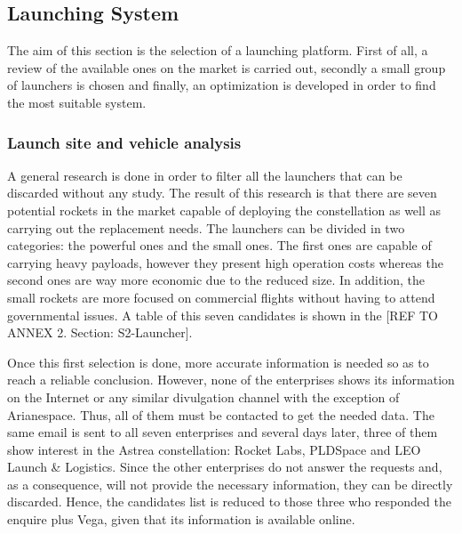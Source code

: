 \subsection{Launching System}
The aim of this section is the selection of a launching platform. First of all, a review of the available ones on the market is carried out, secondly a small group of launchers is chosen and finally, an optimization is developed in order to find the most suitable system. 

\subsubsection{Launch site and vehicle analysis}
A general research is done in order to filter all the launchers that can be discarded without any study. The result of this research is that there are seven potential rockets in the market capable of deploying the constellation as well as carrying out the replacement needs. The launchers can be divided in two categories: the powerful ones and the small ones. The first ones are capable of carrying heavy payloads, however they present high operation costs whereas the second ones are way more economic due to the reduced size. In addition, the small rockets are more focused on commercial flights without having to attend governmental issues. A table of this seven candidates is shown in the [{REF TO ANNEX 2. Section: S2-Launcher}].

Once this first selection is done, more accurate information is needed so as to reach a reliable conclusion. However, none of the enterprises shows its information on the Internet or any similar divulgation channel with the exception of Arianespace. Thus, all of them must be contacted to get the needed data. The same email is sent to all seven enterprises and several days later, three of them show interest in the Astrea constellation: Rocket Labs, PLDSpace and LEO Launch \& Logistics. Since the other enterprises do not answer the requests and, as a consequence, will not provide the necessary information, they can be directly discarded. Hence, the candidates list is reduced to those three who responded the enquire plus Vega, given that its information is available online. 

